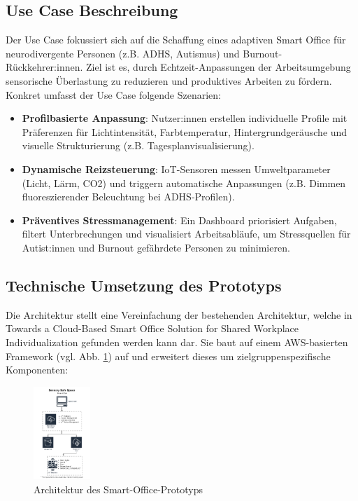 


\subsection{Use Case Beschreibung}
Der Use Case fokussiert sich auf die Schaffung eines adaptiven Smart Office für neurodivergente Personen 
(z.B. ADHS, Autismus) und Burnout-Rückkehrer:innen. Ziel ist es, durch Echtzeit-Anpassungen der Arbeitsumgebung sensorische
Überlastung zu reduzieren und produktives Arbeiten zu fördern. Konkret umfasst der Use Case folgende Szenarien:
\begin{itemize}
    \item \textbf{Profilbasierte Anpassung}: Nutzer:innen erstellen individuelle Profile mit Präferenzen für Lichtintensität,
	 Farbtemperatur, Hintergrundgeräusche und visuelle Strukturierung (z.B. Tagesplanvisualisierung).
    \item \textbf{Dynamische Reizsteuerung}: IoT-Sensoren messen Umweltparameter (Licht, Lärm, CO2) und triggern automatische 
	Anpassungen (z.B. Dimmen fluoreszierender Beleuchtung bei ADHS-Profilen).
    \item \textbf{Präventives Stressmanagement}: Ein Dashboard priorisiert Aufgaben, filtert Unterbrechungen und visualisiert 
	Arbeitsabläufe, um Stressquellen für Autist:innen und Burnout gefährdete Personen zu minimieren.
\end{itemize}

\subsection{Technische Umsetzung des Prototyps}
Die Architektur stellt eine Vereinfachung der bestehenden Architektur, welche in \cite{ref01}{Towards a Cloud-Based Smart Office 
Solution for Shared Workplace Individualization} gefunden werden kann dar. Sie baut auf einem AWS-basierten Framework 
(vgl. Abb. \ref{fig:schematic-prototype}) auf und erweitert dieses um zielgruppenspezifische Komponenten:

\begin{figure}[!h]
	\center
	\includegraphics[height=3.5cm]{fig/SchmematicAwsV5-Seite-3.drawio.png}
		\caption{Architektur des Smart-Office-Prototyps}
		\label{fig:schematic-prototype}
\end{figure}


